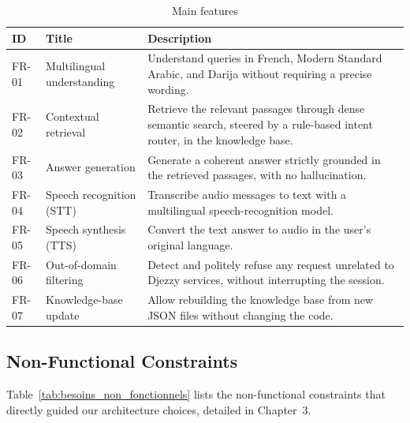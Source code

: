 \documentclass[12pt, a4paper]{report}
\newcommand{\humantext}[1]{#1}      %
\begin{document}
\begin{table}[H]
\centering
\caption{Main features}
\label{tab:besoins_fonctionnels}
\begin{tabularx}{\textwidth}{l l X}
\toprule
\textbf{ID} & \textbf{Title} & \textbf{Description} \\
\midrule
FR-01 & Multilingual understanding & Understand queries in French, Modern Standard Arabic, and Darija without requiring a precise wording. \\
FR-02 & Contextual retrieval       & Retrieve the relevant passages through dense semantic search, steered by a rule-based intent router, in the knowledge base. \\
FR-03 & Answer generation          & Generate a coherent answer strictly grounded in the retrieved passages, with no hallucination. \\
FR-04 & Speech recognition (STT)   & Transcribe audio messages to text with a multilingual speech-recognition model. \\
FR-05 & Speech synthesis (TTS)     & Convert the text answer to audio in the user's original language. \\
FR-06 & Out-of-domain filtering    & Detect and politely refuse any request unrelated to Djezzy services, without interrupting the session. \\
FR-07 & Knowledge-base update       & Allow rebuilding the knowledge base from new JSON files without changing the code. \\
\bottomrule
\end{tabularx}
\end{table}

\subsection{Non-Functional Constraints}

\humantext{Table~\ref{tab:besoins_non_fonctionnels} lists the non-functional constraints that directly guided our architecture choices, detailed in Chapter~3.}
\end{document}
